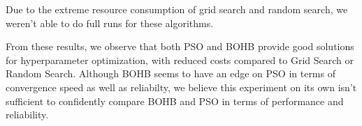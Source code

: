 \documentclass[a4 paper,11pt,2]{article}
\begin{document}
Due to the extreme resource consumption of grid search and random search, we weren't able to do full runs for these algorithms.

From these results, we observe that both PSO and BOHB provide good solutions for hyperparameter optimization, with reduced costs compared to Grid Search or Random Search. Although BOHB seems to have an edge on PSO in terms of convergence speed as well as reliabilty, we believe this experiment on its own isn't sufficient to confidently compare BOHB and PSO in terms of performance and reliability.

\printbibliography
\end{document}
